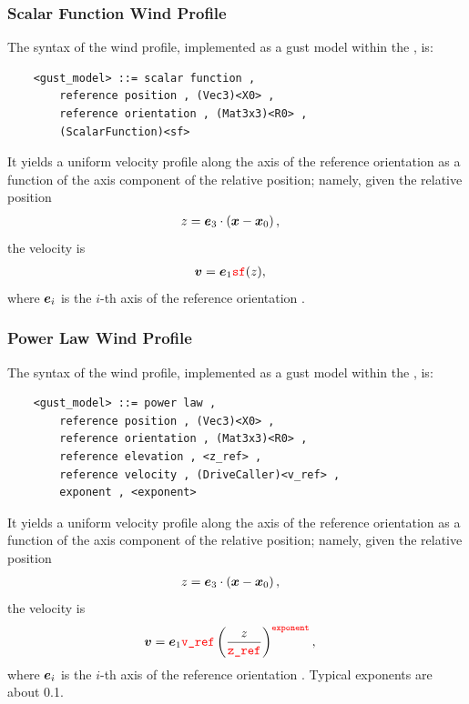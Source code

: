 \subsubsection{Scalar Function Wind Profile}
The syntax of the  wind profile,
implemented as a gust model within the , is:
\begin{verbatim}
    <gust_model> ::= scalar function ,
        reference position , (Vec3)<X0> ,
        reference orientation , (Mat3x3)<R0> ,
        (ScalarFunction)<sf>
\end{verbatim}
It yields a uniform velocity profile along the  axis of the
reference orientation as a function of the  axis component
of the relative position; namely, given the relative position
\begin{align}
	z &= \boldsymbol{e}_3 \cdot \left( \boldsymbol{x} - \boldsymbol{x}_0 \right)
	,
\end{align}
the velocity is
\begin{align}
	\boldsymbol{v}
	&=
	\boldsymbol{e}_1 \textcolor{red}{\texttt{sf}}(z)
	,
\end{align}
where $\boldsymbol{e}_i$ is the $i$-th axis of the reference orientation .



\subsubsection{Power Law Wind Profile}
The syntax of the  wind profile, implemented as a gust model
within the , is:
\begin{verbatim}
    <gust_model> ::= power law ,
        reference position , (Vec3)<X0> ,
        reference orientation , (Mat3x3)<R0> ,
        reference elevation , <z_ref> ,
        reference velocity , (DriveCaller)<v_ref> ,
        exponent , <exponent>
\end{verbatim}
It yields a uniform velocity profile along the  axis of the
reference orientation as a function of the  axis component
of the relative position; namely, given the relative position
\begin{align}
	z &= \boldsymbol{e}_3 \cdot \left( \boldsymbol{x} - \boldsymbol{x}_0 \right)
	,
\end{align}
the velocity is
\begin{align}
	\boldsymbol{v}
	&=
	\boldsymbol{e}_1 \textcolor{red}{\texttt{v\_ref}} \left( \frac{z}{\textcolor{red}{\texttt{z\_ref}}} \right)^{\textcolor{red}{\texttt{exponent}}}
	,
\end{align}
where $\boldsymbol{e}_i$ is the $i$-th axis of the reference orientation .
Typical exponents are about 0.1.



